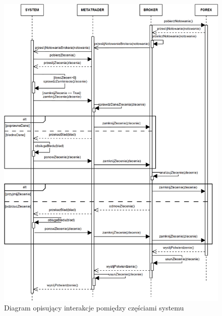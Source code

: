 \documentclass[pdflatex,11pt]{aghdpl}
\begin{document}
\paragraph{}

\begin{figure}[H]
\begin{center}
\includegraphics[width=16cm]{sekwencji.png}
\caption{Diagram opisujący interakcje pomiędzy częściami systemu}
\label{sekwencji}
\end{center}
\end{figure} 
\end{document}
